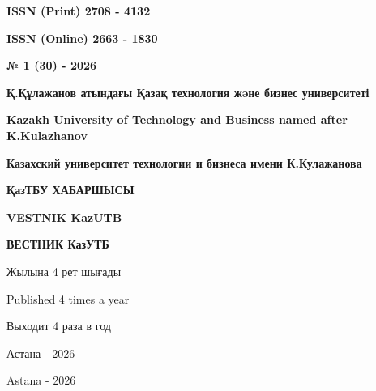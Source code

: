 \begin{flushright}
\textbf{ISSN (Print) 2708 - 4132}

\textbf{ISSN (Online) 2663 - 1830}

\vspace{1cm}

\textbf{№ 1 (30) - 2026}
\end{flushright}

\vfill

\begin{center}
\textbf{\large Қ.Құлажанов атындағы Қазақ технология жəне бизнес университеті}

\vspace{0.3cm}

\textbf{\large Kazakh University of Technology and Business named after K.Kulazhanov}

\vspace{0.3cm}

\textbf{\large Казахский университет технологии и бизнеса имени К.Кулажанова}

\vfill

\textbf{\huge ҚазТБУ ХАБАРШЫСЫ}

\vspace{0.5cm}

\textbf{\huge VESTNIK KazUTB}

\vspace{0.5cm}

\textbf{\huge ВЕСТНИК КазУТБ}

\vfill

Жылына 4 рет шығады

Published 4 times a year

Выходит 4 раза в год

\vfill

Астана - 2026

Astana - 2026
\end{center}

